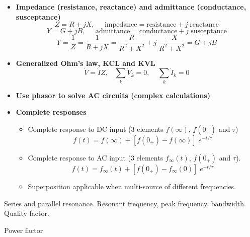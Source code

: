 \begin{itemize}
\item \bf{Impedance (resistance, reactance) and admittance (conductance, 
  susceptance)}
\[Z=R+jX,\;\;\;\;\;\mbox{impedance}=\mbox{resistance}+j\;\mbox{reactance} \]
\[Y=G+jB,\;\;\;\;\;\mbox{admittance}=\mbox{conductance}+j\;\mbox{susceptance} \]
\[ Y=\frac{1}{Z}=\frac{1}{R+jX}=\frac{R}{R^2+X^2}+j\;\frac{-X}{R^2+X^2}=G+jB \]

\item \bf{Generalized Ohm's law, KCL and KVL}
\[ \dot{V}=\dot{I} Z,\;\;\;\sum_k \dot{V}_k=0,\;\;\;\;\sum_k \dot{I}_k=0 \]

\item \bf{Use phasor to solve AC circuits (complex calculations)}

\item \bf{Complete responses}
\begin{itemize}
\item Complete response to DC input (3 elements $f(\infty)$, $f(0_+)$ and 
  $\tau$) 
\[ f(t)=f(\infty)+[f(0_+)-f(\infty)]\;e^{-t/\tau} \]

\item Complete response to AC input (3 elements $f_\infty(t)$, $f(0_+)$ and 
  $\tau$).
\[ f(t)=f_\infty(t)+[f(0_+)-f_\infty(0)]\;e^{-t/\tau}	\]
\item Superposition applicable when multi-source of different frequencies.
\end{itemize}

\end{itemize}



\item Series and parallel resonance. Resonant frequency, peak frequency,
  bandwidth. Quality factor.

\item Power factor 


